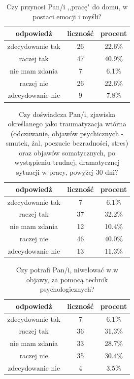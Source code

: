 \documentclass[a4paper,12pt,twoside,openany]{report}
\begin{document}
\begin{table}[h]
\caption{Czy przynosi Pan/i ,,pracę" do domu, w postaci emocji i myśli?}
\centering
\begin{tabular}{ | c | c | c |}
\hline
odpowiedź & liczność & procent\\
\hline
zdecydowanie tak  &  26  & 22.6\% \\
\hline
raczej tak  &  47  & 40.9\% \\
\hline
nie mam zdania  &  7  & 6.1\% \\
\hline
raczej nie  &  26  & 22.6\% \\
\hline
zdecydowanie nie  &  9  & 7.8\% \\
\hline
\end{tabular}
\label{tab:Q10}
\end{table}



\begin{table}[h]
\caption{Czy doświadcza Pan/i, zjawiska określanego jako traumatyzacja wtórna (odczuwanie, objawów psychicznych - smutek, żal, poczucie bezradności, stres) oraz objawów somatycznych, po wystąpieniu trudnej, dramatycznej sytuacji w pracy, powyżej 30 dni?}
\centering
\begin{tabular}{ | c | c | c |}
\hline
odpowiedź & liczność & procent\\
\hline
zdecydowanie tak  &  7  & 6.1\% \\
\hline
raczej tak  &  37  & 32.2\% \\
\hline
nie mam zdania  &  12  & 10.4\% \\
\hline
raczej nie  &  46  & 40.0\% \\
\hline
zdecydowanie nie  &  13  & 11.3\% \\
\hline
\end{tabular}
\label{tab:Q11}
\end{table}



\begin{table}[h]
\caption{Czy potrafi Pan/i, niwelować w.w objawy, za pomocą technik psychologicznych?}
\centering
\begin{tabular}{ | c | c | c |}
\hline
odpowiedź & liczność & procent\\
\hline
zdecydowanie tak  &  7  & 6.1\% \\
\hline
raczej tak  &  36  & 31.3\% \\
\hline
nie mam zdania  &  33  & 28.7\% \\
\hline
raczej nie  &  35  & 30.4\% \\
\hline
zdecydowanie nie  &  4  & 3.5\% \\
\hline
\end{tabular}
\label{tab:Q12}
\end{table}
\end{document}
